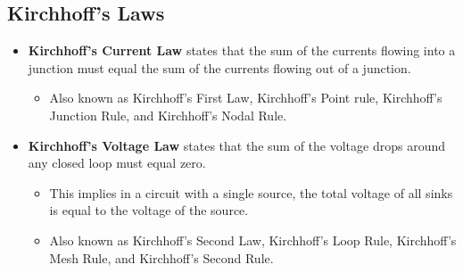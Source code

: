 \documentclass[letterpaper, 12pt]{article}
\begin{document}
\subsection*{Kirchhoff's Laws}
\begin{itemize}
	\item \textbf{Kirchhoff's Current Law} states that the sum of the currents flowing into a junction must equal the sum of the currents flowing out of a junction. 
	\begin{itemize}
		\item Also known as Kirchhoff's First Law, Kirchhoff's Point rule, Kirchhoff's Junction Rule, and Kirchhoff's Nodal Rule.
	\end{itemize}
	\item \textbf{Kirchhoff's Voltage Law} states that the sum of the voltage drops around any closed loop must equal zero.
	\begin{itemize}
		\item This implies in a circuit with a single source, the total voltage of all sinks is equal to the voltage of the source.
		\item Also known as Kirchhoff's Second Law, Kirchhoff's Loop Rule, Kirchhoff's Mesh Rule, and Kirchhoff's Second Rule.
	\end{itemize}
	
\end{itemize}
\end{document}
